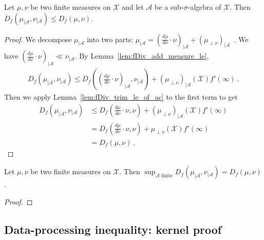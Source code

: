 \begin{theorem}
  \label{thm:fDiv_trim_le}
  \leanok
  Let $\mu, \nu$ be two finite measures on $\mathcal X$ and let $\mathcal A$ be a sub-$\sigma$-algebra of $\mathcal X$. Then
  $D_f(\mu_{| \mathcal A}, \nu_{| \mathcal A}) \le D_f(\mu, \nu)$.
\end{theorem}

\begin{proof}\leanok
{}
We decompose $\mu_{| \mathcal A}$ into two parts: $\mu_{| \mathcal A} = (\frac{d\mu}{d\nu}\cdot \nu)_{| \mathcal A} + (\mu_{\perp \nu})_{| \mathcal A}$~. 
We have $(\frac{d\mu}{d\nu}\cdot \nu)_{| \mathcal A} \ll \nu_{| \mathcal A}$.
By Lemma~\ref{lem:fDiv_add_measure_le},
\begin{align*}
D_f(\mu_{| \mathcal A}, \nu_{| \mathcal A})
\le D_f\left((\frac{d\mu}{d\nu}\cdot \nu)_{| \mathcal A}, \nu_{| \mathcal A}\right)
  + (\mu_{\perp \nu})_{| \mathcal A}(\mathcal X) f'(\infty)
\: .
\end{align*}
Then we apply Lemma~\ref{lem:fDiv_trim_le_of_ac} to the first term to get
\begin{align*}
D_f(\mu_{| \mathcal A}, \nu_{| \mathcal A})
&\le D_f\left(\frac{d\mu}{d\nu}\cdot \nu, \nu\right)
  + (\mu_{\perp \nu})_{| \mathcal A}(\mathcal X) f'(\infty)
\\
&= D_f\left(\frac{d\mu}{d\nu}\cdot \nu, \nu\right)
  + \mu_{\perp \nu}(\mathcal X) f'(\infty)
\\
&= D_f(\mu, \nu)
\: .
\end{align*}
\end{proof}

\begin{theorem}
  \label{thm:iSup_fDiv_trim}
  Let $\mu, \nu$ be two finite measures on $\mathcal X$. Then
  $\sup_{\mathcal A \text{ finite}} D_f(\mu_{| \mathcal A}, \nu_{| \mathcal A}) = D_f(\mu, \nu)$.
\end{theorem}

\begin{proof}
\end{proof}



\subsection{Data-processing inequality: kernel proof}

